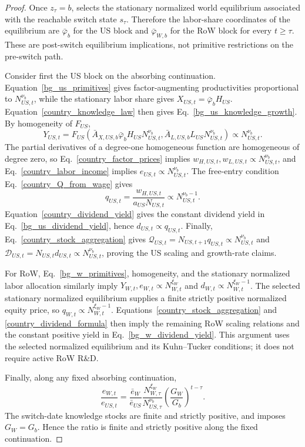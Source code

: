 \documentclass{article}
\def\green#1{#1}%
\begin{document}
\begin{proof}
Once $z_\tau=b$,  selects the stationary normalized world equilibrium associated with the reachable switch state $s_\tau$. Therefore the labor-share coordinates of the equilibrium are $\bar\varphi_b$ for the US block and $\bar\varphi_{W,b}$ for the RoW block for every $t\ge\tau$. These are post-switch equilibrium implications, not primitive restrictions on the pre-switch path.

Consider first the US block on the absorbing continuation. Equation~\eqref{bg_us_primitives} gives factor-augmenting productivities proportional to $N_{US,t}^{\nu_b}$, while the stationary labor share gives $X_{US,t}=\bar\varphi_bH_{US}$. Equation~\eqref{country_knowledge_law} then gives Eq.~\eqref{bg_us_knowledge_growth}. By homogeneity of $F_{US}$,
\[
Y_{US,t}
=
F_{US}(\bar A_{X,US,b}\bar\varphi_bH_{US}N_{US,t}^{\nu_b},\bar A_{L,US,b}L_{US}N_{US,t}^{\nu_b})
\propto N_{US,t}^{\nu_b}.
\]
The partial derivatives of a degree-one homogeneous function are homogeneous of degree zero, so Eq.~\eqref{country_factor_prices} implies $w_{H,US,t},w_{L,US,t}\propto N_{US,t}^{\nu_b}$, and Eq.~\eqref{country_labor_income} implies $e_{US,t}\propto N_{US,t}^{\nu_b}$. The free-entry condition Eq.~\eqref{country_Q_from_wage} gives
\[
q_{US,t}=\frac{w_{H,US,t}}{a_{US}N_{US,t}}\propto N_{US,t}^{\nu_b-1}.
\]
Equation~\eqref{country_dividend_yield} gives the constant dividend yield in Eq.~\eqref{bg_us_dividend_yield}, hence $d_{US,t}\propto q_{US,t}$. Finally, Eq.~\eqref{country_stock_aggregation} gives $\mathcal Q_{US,t}=N_{US,t+1}q_{US,t}\propto N_{US,t}^{\nu_b}$ and $\mathcal D_{US,t}=N_{US,t}d_{US,t}\propto N_{US,t}^{\nu_b}$, proving the US scaling and growth-rate claims.

\green{For} RoW, Eq.~\eqref{bg_w_primitives}, \green{homogeneity}, \green{and the stationary normalized labor allocation similarly imply} $\green{Y}_{\green{W},\green{t}},\green{e}_{\green{W},\green{t}}\green{\propto N}_{\green{W},\green{t}}^{\green{\xi}_\green{W}}$ \green{and} $\green{d}_{\green{W},\green{t}}\green{\propto N}_{\green{W},\green{t}}^{\green{\xi}_\green{W-1}}$.  \green{The selected stationary normalized equilibrium supplies a finite strictly positive normalized equity price}, \green{so} $\green{q}_{\green{W},\green{t}}\green{\propto N}_{\green{W},\green{t}}^{\green{\xi}_\green{W-1}}$.  \green{Equations}~\green{\eqref{country_stock_aggregation} and \eqref{country_dividend_formula} then imply the remaining RoW scaling relations and the constant positive yield in Eq}.~\green{\eqref{bg_w_dividend_yield}}.  \green{This argument uses the selected normalized equilibrium and its Kuhn}--\green{Tucker conditions}; \green{it does not require active RoW R}\&\green{D}.

Finally, along any fixed absorbing continuation,
\[
\frac{e_{W,t}}{e_{US,t}}
=
\frac{\bar e_W}{\bar e_{US}}
\frac{N_{W,\tau}^{\xi_W}}{N_{US,\tau}^{\nu_b}}
\left(\frac{G_W}{G_b}\right)^{t-\tau}.
\]
The switch-date knowledge stocks are finite and strictly positive, and  imposes $G_W=G_b$. Hence the ratio is finite and strictly positive along the fixed continuation.
\end{proof}
\end{document}
